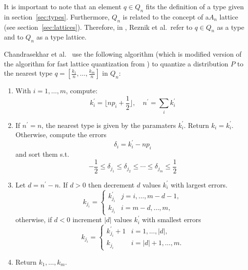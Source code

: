 It is important to note that an element $q \in Q_n$ fits the definition of a type given in section~\ref{sec:types}. Furthermore, $Q_n$ is related to the concept of a$A_n$ lattice (see section~\ref{sec:lattices}). Therefore, in \cite{fastchog}, Reznik et al.\ refer to $q \in Q_n$ as a type and to $Q_n$ as a type lattice.

Chandrasekhar et al.\ \cite{chog2011} use the following algorithm (which is modified version of the algorithm for fast lattice quantization from \cite{ConwayS82a}) to quantize a distribution $P$ to the nearest type $q = [\frac{k_1}{n},\ldots,\frac{k_m}{n}]$ in $Q_n$:
\begin{enumerate}

\item With $i=1,\ldots,m$, compute: \begin{displaymath}
k_i^\prime = \lfloor np_i+\frac{1}{2} \rfloor,\quad n^\prime=\sum_i k_i^\prime
\end{displaymath}

\item \label{algo:step_sort} If $n^\prime = n$, the nearest type is given by the paramaters $k_i^\prime$. Return $k_i = k_i^\prime$. Otherwise, compute the errors
\begin{displaymath}
\delta_i = k_i^\prime - np_i
\end{displaymath}
 and sort them s.t.
\begin{displaymath}
-\frac{1}{2} \leq \delta_{j_1} \leq \delta_{j_2} \leq \cdots \leq \delta_{j_m} \leq \frac{1}{2}
\end{displaymath}

\item \label{algo:step_decrincr} Let $d = n^\prime - n$. If $d > 0$ then decrement $d$ values $k_i^\prime$ with largest errors.
\[
k_{j_i} = \begin{cases}
k_{j_i}^\prime & j = i,\ldots,m-d-1, \\
k_{j_i} & i=m-d,\ldots,m,
\end{cases}
\]
otherwise, if $d < 0$ increment $\left|d\right|$ values $k_i^\prime$ with smallest errors
\[
k_{j_i} = \begin{cases}
k_{j_i}^\prime + 1 & i = 1,\ldots,\left|d\right|, \\
k_{j_i} & i=\left|d\right|+1,\ldots,m.
\end{cases}
\]

\item Return $k_1,\ldots,k_m$.
\end{enumerate}

